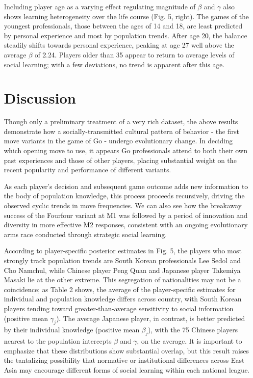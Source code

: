 \documentclass[reqno,12pt]{amsart}
\begin{document}
Including player age as a varying effect regulating magnitude of
\(\beta\) and \(\gamma\) also shows learning heterogeneity over the life
course (Fig. 5, right). The games of the youngest professionals, those
between the ages of 14 and 18, are least predicted by personal
experience and most by population trends. After age 20, the balance
steadily shifts towards personal experience, peaking at age 27 well
above the average \(\beta\) of 2.24. Players older than 35 appear to
return to average levels of social learning; with a few deviations, no
trend is apparent after this age.

\section{Discussion}\label{discussion}

Though only a preliminary treatment of a very rich dataset, the above
results demonstrate how a socially-transmitted cultural pattern of
behavior - the first move variants in the game of Go - undergo
evolutionary change. In deciding which opening move to use, it appears
Go professionals attend to both their own past experiences and those of
other players, placing substantial weight on the recent popularity and
performance of different variants.

As each player's decision and subsequent game outcome adds new
information to the body of population knowledge, this process proceeds
recursively, driving the observed cyclic trends in move frequencies. We
can also see how the breakaway success of the Fourfour variant at M1 was
followed by a period of innovation and diversity in more effective M2
responses, consistent with an ongoing evolutionary arms race conducted
through strategic social learning.

According to player-specific posterior estimates in Fig. 5, the players
who most strongly track population trends are South Korean professionals
Lee Sedol and Cho Namchul, while Chinese player Peng Quan and Japanese
player Takemiya Masaki lie at the other extreme. This segregation of
nationalities may not be a coincidence; as Table 2 shows, the average of
the player-specific estimates for individual and population knowledge
differs across country, with South Korean players tending toward
greater-than-average sensitivity to social information (positive mean
\(\gamma_j\)). The average Japanese player, in contrast, is better
predicted by their individual knowledge (positive mean \(\beta_j\)),
with the 75 Chinese players nearest to the population intercepts
\(\beta\) and \(\gamma\), on the average. It is important to emphasize
that these distributions show substantial overlap, but this result
raises the tantalizing possibility that normative or institutional
differences across East Asia may encourage different forms of social
learning within each national league.
\end{document}
